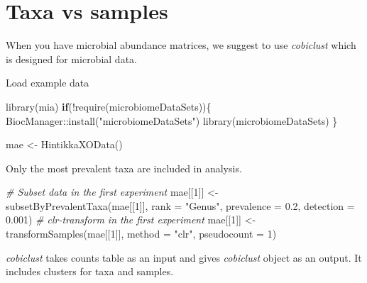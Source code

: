 \documentclass[
]{book}
\newenvironment{Shaded}{\begin{snugshade}}{\end{snugshade}}
\newcommand{\AttributeTok}[1]{\textcolor[rgb]{0.77,0.63,0.00}{#1}}
\newcommand{\CommentTok}[1]{\textcolor[rgb]{0.56,0.35,0.01}{\textit{#1}}}
\newcommand{\ControlFlowTok}[1]{\textcolor[rgb]{0.13,0.29,0.53}{\textbf{#1}}}
\newcommand{\DecValTok}[1]{\textcolor[rgb]{0.00,0.00,0.81}{#1}}
\newcommand{\FloatTok}[1]{\textcolor[rgb]{0.00,0.00,0.81}{#1}}
\newcommand{\FunctionTok}[1]{\textcolor[rgb]{0.00,0.00,0.00}{#1}}
\newcommand{\NormalTok}[1]{#1}
\newcommand{\OtherTok}[1]{\textcolor[rgb]{0.56,0.35,0.01}{#1}}
\newcommand{\SpecialCharTok}[1]{\textcolor[rgb]{0.00,0.00,0.00}{#1}}
\newcommand{\StringTok}[1]{\textcolor[rgb]{0.31,0.60,0.02}{#1}}
\begin{document}
\hypertarget{taxa-vs-samples}{%
\section{Taxa vs samples}\label{taxa-vs-samples}}

When you have microbial abundance matrices, we suggest to use \emph{cobiclust} which is
designed for microbial data.

Load example data

\begin{Shaded}
\begin{Highlighting}[]
\FunctionTok{library}\NormalTok{(mia)}
\ControlFlowTok{if}\NormalTok{(}\SpecialCharTok{!}\FunctionTok{require}\NormalTok{(microbiomeDataSets))\{}
\NormalTok{    BiocManager}\SpecialCharTok{::}\FunctionTok{install}\NormalTok{(}\StringTok{"microbiomeDataSets"}\NormalTok{)}
    \FunctionTok{library}\NormalTok{(microbiomeDataSets)}
\NormalTok{\}}

\NormalTok{mae }\OtherTok{\textless{}{-}} \FunctionTok{HintikkaXOData}\NormalTok{()}
\end{Highlighting}
\end{Shaded}

Only the most prevalent taxa are included in analysis.

\begin{Shaded}
\begin{Highlighting}[]
\CommentTok{\# Subset data in the first experiment}
\NormalTok{mae[[}\DecValTok{1}\NormalTok{]] }\OtherTok{\textless{}{-}} \FunctionTok{subsetByPrevalentTaxa}\NormalTok{(mae[[}\DecValTok{1}\NormalTok{]], }\AttributeTok{rank =} \StringTok{"Genus"}\NormalTok{, }\AttributeTok{prevalence =} \FloatTok{0.2}\NormalTok{, }\AttributeTok{detection =} \FloatTok{0.001}\NormalTok{)}
\CommentTok{\# clr{-}transform in the first experiment}
\NormalTok{mae[[}\DecValTok{1}\NormalTok{]] }\OtherTok{\textless{}{-}} \FunctionTok{transformSamples}\NormalTok{(mae[[}\DecValTok{1}\NormalTok{]], }\AttributeTok{method =} \StringTok{"clr"}\NormalTok{, }\AttributeTok{pseudocount =} \DecValTok{1}\NormalTok{)}
\end{Highlighting}
\end{Shaded}

\emph{cobiclust} takes counts table as an input and gives \emph{cobiclust} object as an output.
It includes clusters for taxa and samples.
\end{document}
